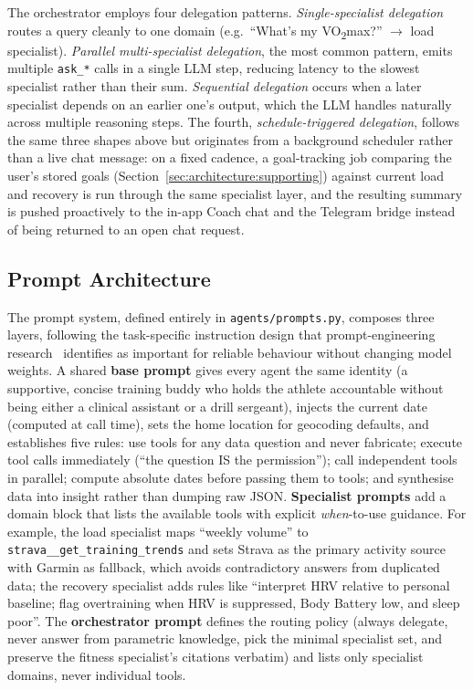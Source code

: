 The orchestrator employs four delegation patterns. \textit{Single-specialist delegation} routes a query cleanly to one domain (e.g.\ ``What's my VO\textsubscript{2}max?'' $\to$ load specialist). \textit{Parallel multi-specialist delegation}, the most common pattern, emits multiple \texttt{ask\_*} calls in a single LLM step, reducing latency to the slowest specialist rather than their sum. \textit{Sequential delegation} occurs when a later specialist depends on an earlier one's output, which the LLM handles naturally across multiple reasoning steps. The fourth, \textit{schedule-triggered delegation}, follows the same three shapes above but originates from a background scheduler rather than a live chat message: on a fixed cadence, a goal-tracking job comparing the user's stored goals (Section~\ref{sec:architecture:supporting}) against current load and recovery is run through the same specialist layer, and the resulting summary is pushed proactively to the in-app Coach chat and the Telegram bridge instead of being returned to an open chat request.

\subsection{Prompt Architecture}\label{sec:agents:prompts}

The prompt system, defined entirely in \texttt{agents/prompts.py}, composes three layers, following the task-specific instruction design that prompt-engineering research~\citep{sahoo_prompt_2024} identifies as important for reliable behaviour without changing model weights. A shared \textbf{base prompt} gives every agent the same identity (a supportive, concise training buddy who holds the athlete accountable without being either a clinical assistant or a drill sergeant), injects the current date (computed at call time), sets the home location for geocoding defaults, and establishes five rules: use tools for any data question and never fabricate; execute tool calls immediately (``the question IS the permission''); call independent tools in parallel; compute absolute dates before passing them to tools; and synthesise data into insight rather than dumping raw JSON. \textbf{Specialist prompts} add a domain block that lists the available tools with explicit \textit{when}-to-use guidance. For example, the load specialist maps ``weekly volume'' to \texttt{strava\_\_get\_training\_trends} and sets Strava as the primary activity source with Garmin as fallback, which avoids contradictory answers from duplicated data; the recovery specialist adds rules like ``interpret HRV relative to personal baseline; flag overtraining when HRV is suppressed, Body Battery low, and sleep poor''. The \textbf{orchestrator prompt} defines the routing policy (always delegate, never answer from parametric knowledge, pick the minimal specialist set, and preserve the fitness specialist's citations verbatim) and lists only specialist domains, never individual tools.

